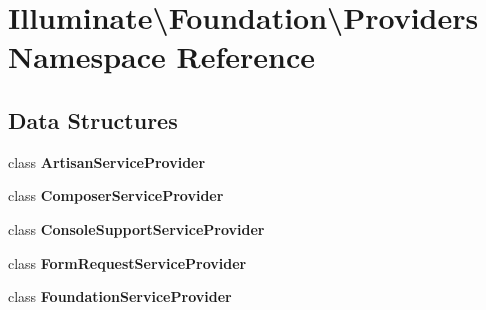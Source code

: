 \section{Illuminate\textbackslash{}Foundation\textbackslash{}Providers Namespace Reference}
\label{namespace_illuminate_1_1_foundation_1_1_providers}
\subsection*{Data Structures}
\begin{DoxyCompactItemize}
\item 
class {\bf Artisan\+Service\+Provider}
\item 
class {\bf Composer\+Service\+Provider}
\item 
class {\bf Console\+Support\+Service\+Provider}
\item 
class {\bf Form\+Request\+Service\+Provider}
\item 
class {\bf Foundation\+Service\+Provider}
\end{DoxyCompactItemize}
